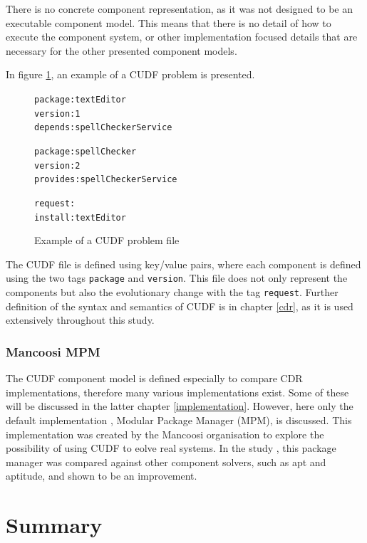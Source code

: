 There is no concrete component representation, as it was not designed to be an executable component model.
This means that there is no detail of how to execute the component system, or other implementation focused details that are necessary for the other presented component models.

In figure \ref{CUDFmetadata}, an example of a CUDF problem is presented.

\begin{figure}[htp] 
\begin{center}
\begin{alltt}
package: textEditor
version: 1
depends: spellCheckerService

package: spellChecker
version: 2
provides: spellCheckerService

request:
install:textEditor

\end{alltt}
  \caption[CUDF meta-data file]{Example of a CUDF problem file}
  \label{CUDFmetadata}
\end{center}
\end{figure}

The CUDF file is defined using key/value pairs, where each component is defined using the two tags \verb+package+ and \verb+version+.
This file does not only represent the components but also the evolutionary change with the tag \verb+request+.
Further definition of the syntax and semantics of CUDF is in chapter \ref{cdr}, as it is used extensively throughout this study.

\subsubsection{Mancoosi MPM}
The CUDF component model is defined especially to compare CDR implementations, therefore many various implementations exist.
Some of these will be discussed in the latter chapter \ref{implementation}.
However, here only the default implementation , Modular Package Manager \cite{abate2011} (MPM), is discussed.
This implementation was created by the Mancoosi organisation to explore the possibility of using CUDF to eolve real systems.
In the study \cite{abate2011}, this package manager was compared against other component solvers, such as apt and aptitude, and shown to be an improvement.

\section{Summary}

